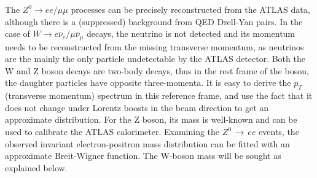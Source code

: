 \documentclass[twocolumn]{article}
\begin{document}
The $Z^0 \rightarrow ee/\mu\mu$ processes can be precisely reconstructed from the ATLAS data, although there is a (suppressed) background from QED Drell-Yan pairs. In the case of $W \rightarrow e \bar{\nu}_e/\mu \bar{\nu}_\mu$ decays, the neutrino is not detected and its momentum needs to be reconstructed from the missing transverse momentum, as neutrinos are the mainly the only particle undetectable by the ATLAS detector. Both the W and Z boson decays are two-body decays, thus in the rest frame of the boson, the daughter particles have opposite three-momenta. It is easy to derive the $p_T$ (transverse momentum) spectrum in this reference frame, and use the fact that it does not change under Lorentz boosts in the beam direction to get an approximate distribution. For the Z boson, its mass is well-known and can be used to calibrate the ATLAS calorimeter. Examining the $Z^0 \, \rightarrow \, ee$ events, the observed invariant electron-positron mass distribution can be fitted with an approximate Breit-Wigner function. The W-boson mass will be sought as explained below. %
\end{document}
